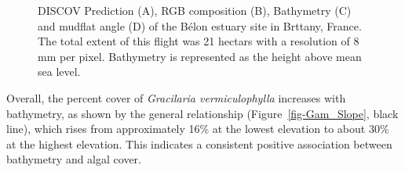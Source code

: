 \documentclass[
  letterpaper,
  DIV=11,
  numbers=noendperiod]{scrartcl}
\begin{document}
\label{cell-fig-Belon}
\begin{figure}[H]


\caption{\label{fig-Belon}DISCOV Prediction (A), RGB composition (B),
Bathymetry (C) and mudflat angle (D) of the Bélon estuary site in
Brttany, France. The total extent of this flight was 21 hectars with a
resolution of 8 mm per pixel. Bathymetry is represented as the height
above mean sea level.}

\end{figure}%

Overall, the percent cover of \emph{Gracilaria vermiculophylla}
increases with bathymetry, as shown by the general relationship
(Figure~\ref{fig-Gam_Slope}, black line), which rises from approximately
16\% at the lowest elevation to about 30\% at the highest elevation.
This indicates a consistent positive association between bathymetry and
algal cover.
\end{document}
